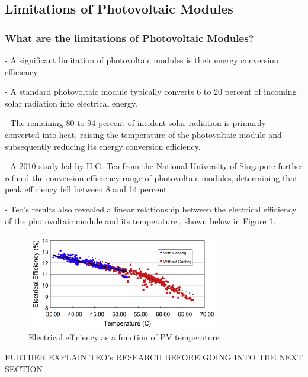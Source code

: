 \subsection{Limitations of Photovoltaic Modules}
\subsubsection{What are the limitations of Photovoltaic Modules?}
- A significant limitation of photovoltaic modules is their energy conversion efficiency.\par
\noindent- A standard photovoltaic module typically converts 6 to 20 percent of incoming solar radiation into electrical energy.\par
\noindent - The remaining 80 to 94 percent of incident solar radiation is primarily converted into heat, raising the temperature of the photovoltaic module and subsequently reducing its energy conversion efficiency. \cite{Dubey2013TemperatureReview}\par
\noindent - A 2010 study led by H.G. Teo from the National University of Singapore further refined the conversion efficiency range of photovoltaic modules, determining that peak efficiency fell between 8 and 14 percent. \cite{Teo2012AnModules}\par
\noindent - Teo's results also revealed a linear relationship between the electrical efficiency of the photovoltaic module and its temperature., shown below in Figure \ref{fig:electrical_efficiency_vs_temperature_pv_module}.\par

\begin{figure}[ht]
    \centering
    \includegraphics[width=0.75\textwidth]{Figures/electrical_efficiency_vs_temperature_pv_module.png}
    \caption{Electrical efficiency as a function of PV temperature \cite{TED-Ed2025HowKomp}}
    \label{fig:electrical_efficiency_vs_temperature_pv_module}
\end{figure}
\FloatBarrier

\noindent FURTHER EXPLAIN TEO's RESEARCH BEFORE GOING INTO THE NEXT SECTION

